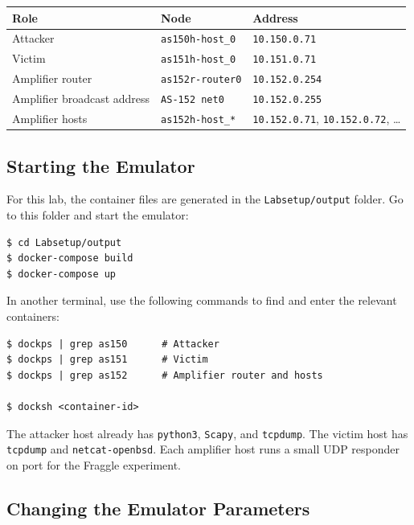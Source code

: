 \begin{center}
\begin{tabular}{|l|l|l|}
\hline
\textbf{Role} & \textbf{Node} & \textbf{Address} \\
\hline
Attacker & \texttt{as150h-host\_0} & \texttt{10.150.0.71} \\
Victim & \texttt{as151h-host\_0} & \texttt{10.151.0.71} \\
Amplifier router & \texttt{as152r-router0} & \texttt{10.152.0.254} \\
Amplifier broadcast address & \texttt{AS-152 net0} & \texttt{10.152.0.255} \\
Amplifier hosts & \texttt{as152h-host\_*} & \texttt{10.152.0.71}, \texttt{10.152.0.72}, \ldots \\
\hline
\end{tabular}
\end{center}


\subsection{Starting the Emulator}



For this lab, the container files are generated in the \texttt{Labsetup/output}
folder. Go to this folder and start the emulator:

\begin{lstlisting}
$ cd Labsetup/output
$ docker-compose build
$ docker-compose up
\end{lstlisting}

In another terminal, use the following commands to find and enter the relevant
containers:

\begin{lstlisting}
$ dockps | grep as150      # Attacker
$ dockps | grep as151      # Victim
$ dockps | grep as152      # Amplifier router and hosts

$ docksh <container-id>
\end{lstlisting}

The attacker host already has \texttt{python3}, \texttt{Scapy}, and
\texttt{tcpdump}. The victim host has \texttt{tcpdump} and
\texttt{netcat-openbsd}. Each amplifier host runs a small UDP responder on port
\fraggleport for the Fraggle experiment.


\subsection{Changing the Emulator Parameters}


